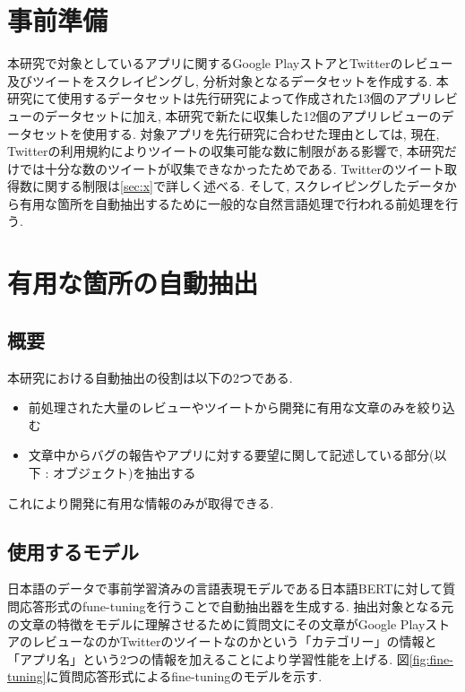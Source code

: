 \section{事前準備}
本研究で対象としているアプリに関するGoogle PlayストアとTwitterのレビュー及びツイートをスクレイピングし, 分析対象となるデータセットを作成する. 本研究にて使用するデータセットは先行研究によって作成された13個のアプリレビューのデータセットに加え, 本研究で新たに収集した12個のアプリレビューのデータセットを使用する. 
対象アプリを先行研究に合わせた理由としては, 現在, Twitterの利用規約によりツイートの収集可能な数に制限がある影響で, 本研究だけでは十分な数のツイートが収集できなかったためである. Twitterのツイート取得数に関する制限は\ref{sec:x}で詳しく述べる. 
そして, スクレイピングしたデータから有用な箇所を自動抽出するために一般的な自然言語処理で行われる前処理を行う. 


\section{有用な箇所の自動抽出}
\subsection{概要}
本研究における自動抽出の役割は以下の2つである. 
\begin{itemize}
  \item 前処理された大量のレビューやツイートから開発に有用な文章のみを絞り込む
  \item 文章中からバグの報告やアプリに対する要望に関して記述している部分(以下 : オブジェクト)を抽出する
\end{itemize}
これにより開発に有用な情報のみが取得できる. 

\subsection{使用するモデル}
日本語のデータで事前学習済みの言語表現モデルである日本語BERTに対して質問応答形式のfune-tuningを行うことで自動抽出器を生成する. 
抽出対象となる元の文章の特徴をモデルに理解させるために質問文にその文章がGoogle PlayストアのレビューなのかTwitterのツイートなのかという「カテゴリー」の情報と「アプリ名」という2つの情報を加えることにより学習性能を上げる. 
図\ref{fig:fine-tuning}に質問応答形式によるfine-tuningのモデルを示す. 

